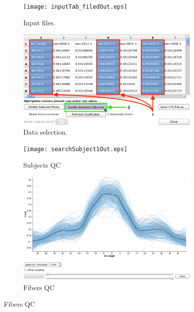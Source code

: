 \documentclass[]{spie}  %
\begin{document}
\begin{figure}
	\centering 

	\begin{subfigure}{0.45\textwidth}
    	\texttt{[image: inputTab\_filedOut.eps]}
    	\caption{Input files.}
    	\label{fig:inputTab}
	\end{subfigure}
	\begin{subfigure}{0.45\textwidth}
    	\includegraphics[width=\textwidth]{deleteColumnsOut.eps}
		\caption{Data selection.}
		\label{fig:deleteColumnsOut}
	\end{subfigure}

	\begin{subfigure}{0.45\textwidth}
    	\texttt{[image: searchSubject1Out.eps]}
		\caption{Subjects QC}
		\label{fig:subjectsTab_filed}
	\end{subfigure}	
	\begin{subfigure}{0.45\textwidth}
    	\includegraphics[width=\textwidth]{applyQC1Out.eps}
    	\caption{Fibers QC}
    	\label{fig:applyQC1}
	\end{subfigure}


\end{figure}
\end{document}
